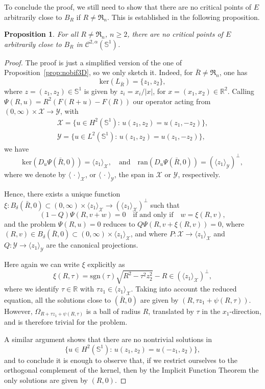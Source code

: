 \documentclass[10pt,reqno,english]{amsart}
\newcommand{\Su}{\mathbb{S}^1}
\newcommand{\rn}{{\mathfrak R}_n  }
\newcommand{\R} {\mathbb R}
\newtheorem{prop}[lemma]{Proposition}
\theoremstyle{definition}
\numberwithin{equation}{section}
\begin{document}
To conclude the proof, we still need to show that there are no critical points of $E$ arbitrarily close to $B_R$ if $R \not= \rn$. This is established in the following proposition.


\begin{prop}
\label{prop:nobif2D}
For all $R\not=\rn$, $n\ge2$, there are no critical points of $E$ arbitrarily close to $B_R$ in $\mathcal C^{2,\alpha}(\Su)$.
\end{prop}
\begin{proof}
The proof is just a simplified version of the one of Proposition~\ref{prop:nobif3D}, so we only sketch it. Indeed, for $\bar R\not=\rn$, one has
\[
\mathrm{ker}(L_{\bar R})=\{z_1,z_2\},
\]
where $z=(z_1,z_2)\in\Su$ is given by $z_i=x_i/|x|$, for $x=(x_1,x_2)\in\R^2$. Calling $\Psi(R,u)=R^2(F(R+u)-F(R))$ our operator acting from $(0,\infty)\times\mathcal X\to\mathcal Y$, with
\begin{gather*}
\mathcal X=\{u\in H^2(\Su):\,u(z_1,z_2)=u(z_1,-z_2)\},\\
\mathcal Y=\{u\in L^2(\Su):\,u(z_1,z_2)=u(z_1,-z_2)\},
\end{gather*}
 we have
\[
\mathrm{ker}(D_u\Psi(\bar R,0))=\langle{z_1}\rangle_{\mathcal X},\quad\text{and}\quad \mathrm{ran}(D_u\Psi(\bar R,0))=(\langle{z_1}\rangle_{\mathcal Y})^\perp,
\]
where we denote by $\langle{\,\cdot\,}\rangle_{\mathcal X}$, or $\langle{\,\cdot\,}\rangle_{\mathcal Y}$, the span in $\mathcal X$ or $\mathcal Y$, respectively.

Hence, there exists a unique function $\xi:B_\delta(\bar R,0)\subset(0,\infty)\times\langle z_1\rangle_{\mathcal{X}}\to(\langle z_1\rangle_{\mathcal{X}})^\perp$ such that
\[
(1-Q)\Psi(R,v+w)=0\quad\text{if and only if}\quad w=\xi(R,v),
\]
and the problem $\Psi(R,u)=0$ reduces to $Q\Psi(R,v+\xi(R,v))=0$, where $(R,v)\in B_\delta(\bar R,0)\subset(0,\infty)\times\langle z_1\rangle_{\mathcal{X}}$, and where $P:\mathcal X\to  \langle{z_1}\rangle_{\mathcal X}$ and $Q:\mathcal Y\to \langle{z_1}\rangle_{\mathcal Y}$ are the canonical projections.

Here again we can write $\xi$ explicitly as
\[
\xi(R,\tau)=\text{sgn}(\tau)\sqrt{R^{2}-\tau^{2}z_2^2}-R\in(\langle z_1 \rangle_{\mathcal X})^{\perp},
\]
where we identify $\tau\in\R$ with $\tau z_1\in\langle{z_1}\rangle_{\mathcal X}$.
Taking into account the reduced equation, all the solutions close to $(\bar R,0)$ are given by $(R,\tau z_1+\psi(R,\tau))$. However, $\Omega_{R+\tau z_1+\psi(R,\tau)}$ is a ball of radius $R$, translated by $\tau$ in the $x_1$-direction, and is therefore trivial for the problem.

A similar argument shows that there are no nontrivial solutions in
\[
\{u\in H^2(\Su):\,u(z_1,z_2)=u(-z_1,z_2)\},
\]
and to conclude it is enough to observe that, if we restrict ourselves to the orthogonal complement of the kernel, then by the Implicit Function Theorem the only solutions are given by $(R,0)$.
\end{proof}
\end{document}
